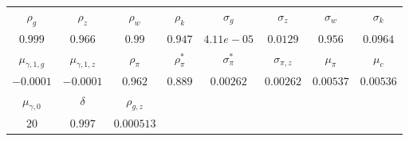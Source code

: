 \begin{tabular}{cccccccc} \\ \hline$\rho_g$&$\rho_z$&$\rho_w$&$\rho_k$&$\sigma_g$&$\sigma_z$&$\sigma_w$&$\sigma_k$\\$0.999$&$0.966$&$0.99$&$0.947$&$4.11e-05$&$0.0129$&$0.956$&$0.0964$\\ \hline$\mu_{\gamma,1,g}$&$\mu_{\gamma,1,z}$&$\rho_\pi$&$\rho_{\pi}^*$&$\sigma_{\pi}^*$&$\sigma_{\pi,z}$&$\mu_\pi$&$\mu_c$\\$-0.0001$&$-0.0001$&$0.962$&$0.889$&$0.00262$&$0.00262$&$0.00537$&$0.00536$\\ \hline$\mu_{\gamma,0}$&$\delta$&$\rho_{g,z}$\\$20$&$0.997$&$0.000513$\\ \hline \end{tabular}